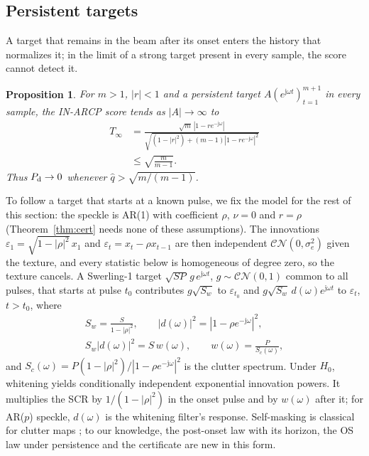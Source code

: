 \documentclass[journal]{IEEEtran}
\newtheorem{proposition}{Proposition}
\begin{document}
\subsection{Persistent targets}
A target that remains in the beam after its onset enters the history that normalizes it; in the limit of a strong target present in every sample, the score cannot detect it.
\begin{proposition}\label{prop:blind}
For $m>1$, $|r|<1$ and a persistent target $A(e^{\mathrm j\omega t})_{t=1}^{m+1}$ in every sample, the IN-ARCP score tends as $|A|\to\infty$ to
\[
\begin{aligned}
T_\infty&=\frac{\sqrt m\,|1-re^{-\mathrm j\omega}|}
{\sqrt{(1-|r|^2)+(m-1)|1-re^{-\mathrm j\omega}|^2}}\\
&\le\sqrt{\frac{m}{m-1}}.
\end{aligned}
\]
Thus $P_{\rm d}\to0$ whenever $\widehat q>\sqrt{m/(m-1)}$.
\end{proposition}
To follow a target that starts at a known pulse, we fix the model for the rest of this section: the speckle is AR(1) with coefficient $\rho$, $\nu=0$ and $r=\rho$ (Theorem~\ref{thm:cert} needs none of these assumptions). The innovations $\varepsilon_1=\sqrt{1-|\rho|^2}\,x_1$ and $\varepsilon_t=x_t-\rho x_{t-1}$ are then independent $\mathcal{CN}(0,\sigma_e^2)$ given the texture, and every statistic below is homogeneous of degree zero, so the texture cancels. A Swerling-1 target $\sqrt{SP}\,g\,e^{\mathrm j\omega t}$, $g\sim\mathcal{CN}(0,1)$ common to all pulses, that starts at pulse $t_0$ contributes $g\sqrt{S_w}$ to $\varepsilon_{t_0}$ and $g\sqrt{S_w}\,d(\omega)e^{\mathrm j\omega t}$ to $\varepsilon_t$, $t>t_0$, where
\begin{equation}
\begin{gathered}
S_w=\frac{S}{1-|\rho|^2},\qquad |d(\omega)|^2=|1-\rho e^{-\mathrm j\omega}|^2,\\
S_w|d(\omega)|^2=S\,w(\omega),\qquad w(\omega)=\frac{P}{S_c(\omega)},
\end{gathered}
\label{eq:whitenedscr}
\end{equation}
and $S_c(\omega)=P(1-|\rho|^2)/|1-\rho e^{-\mathrm j\omega}|^2$ is the clutter spectrum. Under $H_0$, whitening yields conditionally independent exponential innovation powers. It multiplies the SCR by $1/(1-|\rho|^2)$ in the onset pulse and by $w(\omega)$ after it; for AR($p$) speckle, $d(\omega)$ is the whitening filter's response. Self-masking is classical for clutter maps \cite{lops1989,naldi1999}; to our knowledge, the post-onset law with its horizon, the OS law under persistence and the certificate are new in this form.
\end{document}
